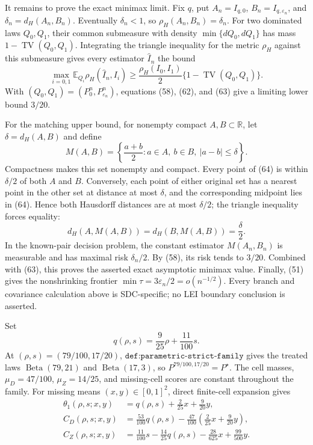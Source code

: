 It remains to prove the exact minimax limit.  Fix \(q\), put \(A_n=I_{q,0}\), \(B_n=I_{q,\varepsilon_n}\), and \(\delta_n=d_H(A_n,B_n)\).  Eventually \(\delta_n<1\), so \(\rho_H(A_n,B_n)=\delta_n\).  For two dominated laws \(Q_0,Q_1\), their common submeasure with density \(\min\{dQ_0,dQ_1\}\) has mass \(1-\operatorname{TV}(Q_0,Q_1)\).  Integrating the triangle inequality for the metric \(\rho_H\) against this submeasure gives every estimator \(\widehat I_n\) the bound
\[
 \max_{i=0,1}\mathbb E_{Q_i}\rho_H(\widehat I_n,I_i)
 \ge\frac{\rho_H(I_0,I_1)}2
       \{1-\operatorname{TV}(Q_0,Q_1)\}.                                    \tag{63}
\]
With \((Q_0,Q_1)=(P_0^n,P_{\varepsilon_n}^n)\), equations (58), (62), and (63) give a limiting lower bound \(3/20\).

For the matching upper bound, for nonempty compact \(A,B\subset\mathbb R\), let \(\delta=d_H(A,B)\) and define
\[
 M(A,B)=\left\{\frac{a+b}{2}:a\in A,\ b\in B,\ |a-b|\le\delta\right\}.     \tag{64}
\]
Compactness makes this set nonempty and compact.  Every point of (64) is within \(\delta/2\) of both \(A\) and \(B\).  Conversely, each point of either original set has a nearest point in the other set at distance at most \(\delta\), and the corresponding midpoint lies in (64).  Hence both Hausdorff distances are at most \(\delta/2\); the triangle inequality forces equality:
\[
 d_H(A,M(A,B))=d_H(B,M(A,B))=\frac\delta2.                                   \tag{65}
\]
In the known-pair decision problem, the constant estimator \(M(A_n,B_n)\) is measurable and has maximal risk \(\delta_n/2\).  By (58), its risk tends to \(3/20\).  Combined with (63), this proves the asserted exact asymptotic minimax value.  Finally, (51) gives the nonshrinking frontier \(\min\tau=3\varepsilon_n/2=o(n^{-1/2})\).  Every branch and covariance calculation above is SDC-specific; no LEI boundary conclusion is asserted.

Set
\[
 q(\rho,s)=\frac9{25}\rho+\frac{11}{100}s.
\]
At \((\rho,s)=(79/100,17/20)\), \(\texttt{def:parametric-strict-family}\) gives the treated laws \(\operatorname{Beta}(79,21)\) and \(\operatorname{Beta}(17,3)\), so \(P^{79/100,17/20}=P^\star\).  The cell masses, \(\mu_D=47/100\), \(\mu_Z=14/25\), and missing-cell scores are constant throughout the family.  For missing means \((x,y)\in[0,1]^2\), direct finite-cell expansion gives
\[
 \begin{aligned}
 \theta_1(\rho,s;x,y)
 &=q(\rho,s)+\frac2{25}x+\frac9{20}y,\\
 C_D(\rho,s;x,y)
 &=\frac{53}{100}q(\rho,s)
   -\frac{47}{100}\left(\frac2{25}x+\frac9{20}y\right),\\
 C_Z(\rho,s;x,y)
 &=\frac{11}{100}s-\frac{14}{25}q(\rho,s)
   -\frac{28}{625}x+\frac{99}{500}y.
 \end{aligned}                                                               \tag{66}
\]


